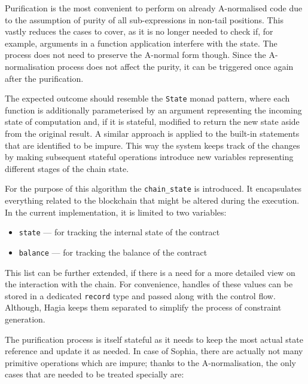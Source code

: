 Purification is the most convenient to perform on already A-normalised code due
to the assumption of purity of all sub-expressions in non-tail positions. This
vastly reduces the cases to cover, as it is no longer needed to check if, for
example, arguments in a function application interfere with the state. The
process does not need to preserve the A-normal form though. Since the
A-normalisation process does not affect the purity, it can be triggered once
again after the purification.

The expected outcome should resemble the \texttt{State} monad
\cite{markp.jones1995} pattern, where each function is additionally
parameterised by an argument representing the incoming state of computation and,
if it is stateful, modified to return the new state aside from the original
result. A similar approach is applied to the built-in statements that are
identified to be impure. This way the system keeps track of the changes by
making subsequent stateful operations introduce new variables representing
different stages of the chain state.

For the purpose of this algorithm the \texttt{chain\_state} is introduced. It
encapsulates everything related to the blockchain that might be altered during
the execution. In the current implementation, it is limited to two variables:

\begin{itemize}
\item \texttt{state} --- for tracking the internal state of the contract
\item \texttt{balance} --- for tracking the balance of the contract
\end{itemize}

This list can be further extended, if there is a need for a more detailed view
on the interaction with the chain. For convenience, handles of these values can
be stored in a dedicated \texttt{record} type and passed along with the control
flow. Although, Hagia keeps them separated to simplify the process of constraint
generation.

The purification process is itself stateful as it needs to keep the most actual
state reference and update it as needed. In case of Sophia, there are actually
not many primitive operations which are impure; thanks to the A-normalisation,
the only cases that are needed to be treated specially are:

